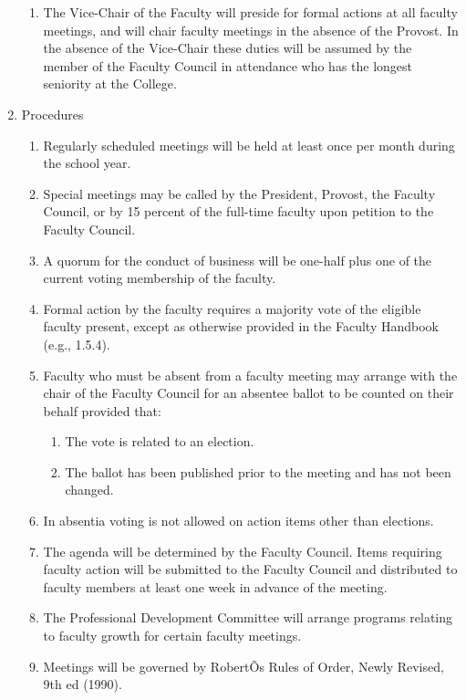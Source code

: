 \documentclass[letterpaper, 11pt]{article}
\begin{document}
\begin{enumerate}[label=\alph*)]
{\begin{enumerate}[label=\arabic*)]
							\item{The Vice-Chair of the Faculty will preside for formal actions at all faculty meetings, and will chair faculty meetings in the absence of the Provost.  In the absence of the Vice-Chair these duties will be assumed by the member of the Faculty Council in attendance who has the longest seniority at the College.}
						\end{enumerate}
					}
					\item{Procedures
						\begin{enumerate}[label=\arabic*)]
							\item{Regularly scheduled meetings will be held at least once per month during the school year.}
							\item{Special meetings may be called by the President, Provost, the Faculty Council, or by 15 percent of the full-time faculty upon petition to the Faculty Council.}
							\item{A quorum for the conduct of business will be one-half plus one of the current voting membership of the faculty.}
							\item{Formal action by the faculty requires a majority vote of the eligible faculty present, except as otherwise provided in the Faculty Handbook (e.g., 1.5.4).}
							\item{Faculty who must be absent from a faculty meeting may arrange with the chair of the Faculty Council for an absentee ballot to be counted on their behalf provided that:
								\begin{enumerate}[label=(\arabic*)]
									\item{The vote is related to an election.}
									\item{The ballot has been published prior to the meeting and has not been changed.}
								\end{enumerate}
							}
							\item{In absentia voting is not allowed on action items other than elections.}
							\item{The agenda will be determined by the Faculty Council.  Items requiring faculty action will be submitted to the Faculty Council and distributed to faculty members at least one week in advance of the meeting.}
							\item{The Professional Development Committee will arrange programs relating to faculty growth for certain faculty meetings.}
							\item{Meetings will be governed by RobertÕs Rules of Order, Newly Revised, 9th ed (1990).}

\end{enumerate}}
\end{enumerate}
\end{document}
